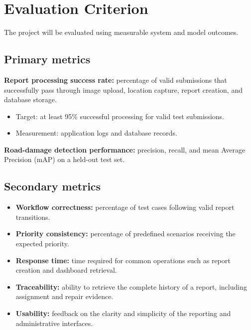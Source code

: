 \documentclass[11pt,a4paper]{article}
\begin{document}
\section{Evaluation Criterion}

The project will be evaluated using measurable system and model outcomes.

\subsection{Primary metrics}

\textbf{Report processing success rate:} percentage of valid submissions that successfully pass through image upload, location capture, report creation, and database storage.

\begin{itemize}[leftmargin=0.6cm]
    \item Target: at least 95\% successful processing for valid test submissions.
    \item Measurement: application logs and database records.
\end{itemize}

\textbf{Road-damage detection performance:} precision, recall, and mean Average Precision (mAP) on a held-out test set.

\subsection{Secondary metrics}

\begin{itemize}[leftmargin=0.6cm]

    \item \textbf{Workflow correctness:} percentage of test cases following valid report transitions.

    \item \textbf{Priority consistency:} percentage of predefined scenarios receiving the expected priority.

    \item \textbf{Response time:} time required for common operations such as report creation and dashboard retrieval.

    \item \textbf{Traceability:} ability to retrieve the complete history of a report, including assignment and repair evidence.

    \item \textbf{Usability:} feedback on the clarity and simplicity of the reporting and administrative interfaces.

\end{itemize}
\end{document}
